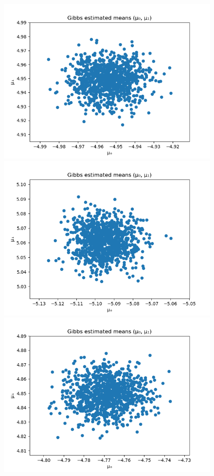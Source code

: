 \begin{figure}
	\centering
	\includegraphics[scale=0.5]{gibbs-estimated-means-1.png}
	\includegraphics[scale=0.5]{gibbs-estimated-means-2.png}
	\includegraphics[scale=0.5]{gibbs-estimated-means-3.png}

\end{figure}
